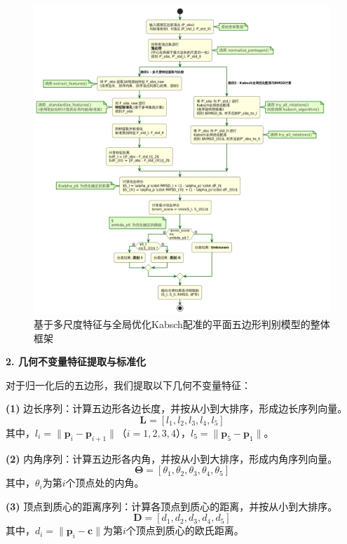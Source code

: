 \begin{figure}[H]
    \centering
    \includegraphics[width=1\textwidth]{figures/model1.png}
    \caption{基于多尺度特征与全局优化Kabsch配准的平面五边形判别模型的整体框架}
    \label{fig:model_framework}
\end{figure}

\textbf{2. 几何不变量特征提取与标准化}

对于归一化后的五边形，我们提取以下几何不变量特征：

\textbf{(1)} 边长序列：计算五边形各边长度，并按从小到大排序，形成边长序列向量。
\begin{equation}
    \mathbf{L} = [l_1, l_2, l_3, l_4, l_5]
\end{equation}
其中，$l_i = \|\mathbf{p}_i - \mathbf{p}_{i+1}\|$（$i=1,2,3,4$），$l_5 = \|\mathbf{p}_5 - \mathbf{p}_1\|$。

\textbf{(2)} 内角序列：计算五边形各内角，并按从小到大排序，形成内角序列向量。
\begin{equation}
   \bm{\Theta} = [\theta_1, \theta_2, \theta_3, \theta_4, \theta_5]
\end{equation}
其中，$\theta_i$为第$i$个顶点处的内角。

\textbf{(3)} 顶点到质心的距离序列：计算各顶点到质心的距离，并按从小到大排序。
\begin{equation}
    \mathbf{D} = [d_1, d_2, d_3, d_4, d_5]
\end{equation}
其中，$d_i = \|\mathbf{p}_i - \mathbf{c}\|$为第$i$个顶点到质心的欧氏距离。

